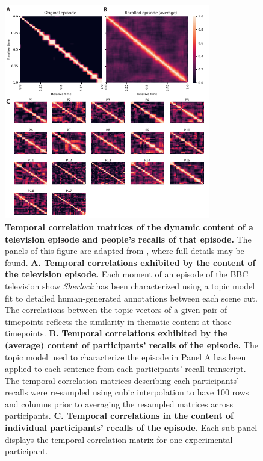 \documentclass{article}
\begin{document}
\begin{figure}[tp] \centering \includegraphics[width=0.8\textwidth]{figs/pres_rec_corrmats_sherlock} \caption{\textbf{Temporal correlation matrices of the dynamic content of a television episode and people's recalls of that episode.}  The panels of this figure are adapted from \cite{HeusEtal18c}, where full details may be found. \textbf{A. Temporal correlations exhibited by the content of the television episode.}  Each moment of an episode of the BBC television show \textit{Sherlock} has been characterized using a topic model~\citep{BleiEtal03} fit to detailed human-generated annotations between each scene cut.  The correlations between the topic vectors of a given pair of timepoints reflects the similarity in thematic content at those timepoints.  \textbf{B. Temporal correlations exhibited by the (average) content of participants' recalls of the episode.} The topic model used to characterize the episode in Panel A has been applied to each sentence from each participants' recall transcript.  The temporal correlation matrices describing each participants' recalls were re-sampled using cubic interpolation to have 100 rows and columns prior to averaging the resampled matrices across participants.  \textbf{C. Temporal correlations in the content of individual participants' recalls of the episode.} Each sub-panel displays the temporal correlation matrix for one experimental participant.}
\label{fig:corrmats}
\end{figure}
\end{document}

